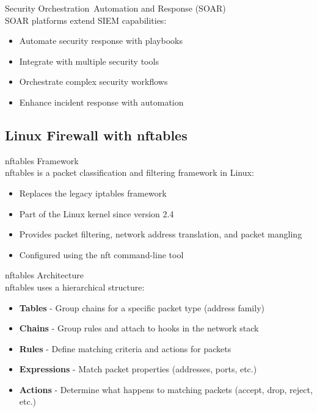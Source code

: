 \begin{concept}{Security Orchestration\, Automation and Response (SOAR)}\\
SOAR platforms extend SIEM capabilities:
\begin{itemize}
    \item Automate security response with playbooks
    \item Integrate with multiple security tools
    \item Orchestrate complex security workflows
    \item Enhance incident response with automation
\end{itemize}
\end{concept}

\subsection{Linux Firewall with nftables}

\begin{definition}{nftables Framework}\\
nftables is a packet classification and filtering framework in Linux:
\begin{itemize}
    \item Replaces the legacy iptables framework
    \item Part of the Linux kernel since version 2.4
    \item Provides packet filtering, network address translation, and packet mangling
    \item Configured using the nft command-line tool
\end{itemize}
\end{definition}

\begin{concept}{nftables Architecture}\\
nftables uses a hierarchical structure:
\begin{itemize}
    \item \textbf{Tables} - Group chains for a specific packet type (address family)
    \item \textbf{Chains} - Group rules and attach to hooks in the network stack
    \item \textbf{Rules} - Define matching criteria and actions for packets
    \item \textbf{Expressions} - Match packet properties (addresses, ports, etc.)
    \item \textbf{Actions} - Determine what happens to matching packets (accept, drop, reject, etc.)
\end{itemize}
\end{concept}

